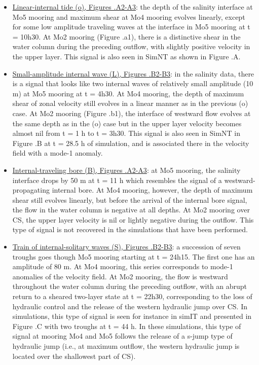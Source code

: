 \begin{itemize}
\item \underline{Linear-internal tide (o), Figures .A2-A3}: the depth of the salinity interface at Mo5 mooring and maximum shear at Mo4 mooring evolves linearly, except for some low amplitude traveling waves at the interface in Mo5 mooring at t = 10h30. At Mo2 mooring (Figure .a1), there is a distinctive shear in the water column during the preceding outflow, with slightly positive velocity in the upper layer. This signal is also seen in SimNT as shown in Figure .A.
%
\item \underline{Small-amplitude internal wave (L), Figures .B2-B3}: in the salinity data, there is a signal that looks like two internal waves of relatively small amplitude (10 m) at Mo5 mooring at t = 4h30. At Mo4 mooring, the depth of maximum shear of zonal velocity still evolves in a linear manner as in the previous (o) case. At Mo2 mooring (Figure .b1), the interface of westward flow evolves at the same depth as in the (o) case but in the upper layer velocity becomes almost nil from t = 1 h to t = 3h30. This signal is also seen in SimNT in Figure .B at t = 28.5 h of simulation, and is associated there in the velocity field with a mode-1 anomaly.
%
\item \underline{Internal-traveling bore (B), Figures .A2-A3}: at Mo5 mooring, the salinity interface drops by 50 m at t = 11 h which resembles the signal of a westward-propagating internal bore. At Mo4 mooring, however, the depth of maximum shear still evolves linearly, but before the arrival of the internal bore signal, the flow in the water column is negative at all depths. At Mo2 mooring over CS, the upper layer velocity is nil or lightly negative during the outflow. This type of signal is not recovered in the simulations that have been performed.
%
\item \underline{Train of internal-solitary waves (S), Figures .B2-B3}: a succession of seven troughs goes though Mo5 mooring starting at t = 24h15. The first one has an amplitude of 80 m. At Mo4 mooring, this series corresponds to mode-1 anomalies of the velocity field. At Mo2 mooring, the flow is westward throughout the water column during the preceding outflow, with an abrupt return to a sheared two-layer state at t = 22h30, corresponding to the loss of hydraulic control and the release of the western hydraulic jump over CS. In simulations, this type of signal is seen for instance in simIT and presented in Figure .C with two troughs at  t = 44 h. In these simulations, this type of signal at mooring Mo4 and Mo5 follows the release of a s-jump type of hydraulic jump (i.e., at maximum outflow, the western hydraulic jump is located over the shallowest part of CS).

\end{itemize}
